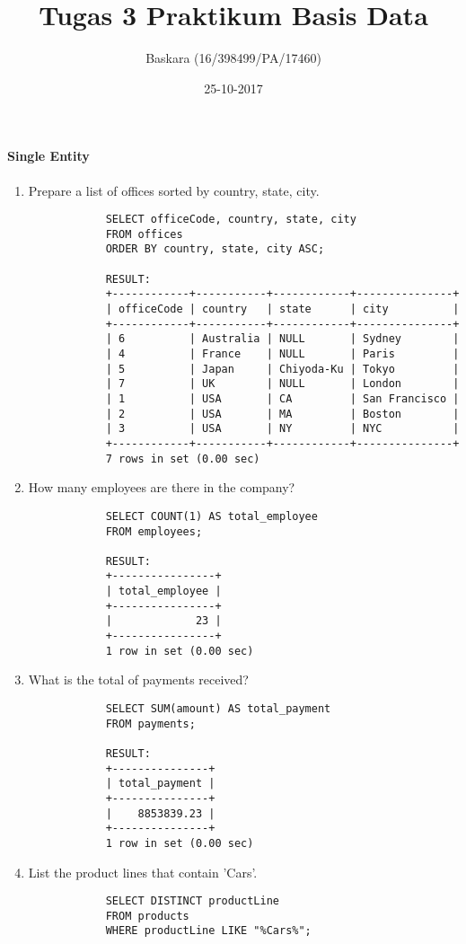 \documentclass{article}
\title{Tugas 3 Praktikum Basis Data}
\author{Baskara (16/398499/PA/17460)}
\date{25-10-2017}
\begin{document}
	\maketitle
	\paragraph{Single Entity}
	\begin{enumerate}
		\item Prepare a list of offices sorted by country, state, city.
			\begin{verbatim}
			SELECT officeCode, country, state, city
			FROM offices
			ORDER BY country, state, city ASC;
			
			RESULT:
			+------------+-----------+------------+---------------+
			| officeCode | country   | state      | city          |
			+------------+-----------+------------+---------------+
			| 6          | Australia | NULL       | Sydney        |
			| 4          | France    | NULL       | Paris         |
			| 5          | Japan     | Chiyoda-Ku | Tokyo         |
			| 7          | UK        | NULL       | London        |
			| 1          | USA       | CA         | San Francisco |
			| 2          | USA       | MA         | Boston        |
			| 3          | USA       | NY         | NYC           |
			+------------+-----------+------------+---------------+
			7 rows in set (0.00 sec)
			\end{verbatim}
		\item How many employees are there in the company?
			\begin{verbatim}
			SELECT COUNT(1) AS total_employee
			FROM employees;
			
			RESULT:
			+----------------+
			| total_employee |
			+----------------+
			|             23 |
			+----------------+
			1 row in set (0.00 sec)
			\end{verbatim}
		\item What is the total of payments received?
			\begin{verbatim}
			SELECT SUM(amount) AS total_payment
			FROM payments;
			
			RESULT:
			+---------------+
			| total_payment |
			+---------------+
			|    8853839.23 |
			+---------------+
			1 row in set (0.00 sec)
			\end{verbatim}
		\item List the product lines that contain 'Cars'.
			\begin{verbatim}
			SELECT DISTINCT productLine
			FROM products
			WHERE productLine LIKE "%Cars%";
			

\end{verbatim}
\end{enumerate}
\end{document}
